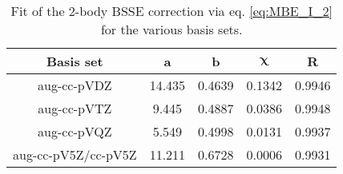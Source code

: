 \begin{table}[t]
\begin{adjustbox}{width=\columnwidth,center}
\begin{tabular}{@{}ccccc@{}}
\toprule
\textbf{Basis set}  & \textbf{a} & \textbf{b} & $\mathbf{\chi}$ & \textbf{R} \\
\hline
aug-cc-pVDZ         & 14.435 & 0.4639 & 0.1342 & 0.9946 \\
aug-cc-pVTZ         & 9.445  & 0.4887 & 0.0386 & 0.9948 \\
aug-cc-pVQZ         & 5.549  & 0.4998 & 0.0131 & 0.9937 \\
aug-cc-pV5Z/cc-pV5Z & 11.211 & 0.6728 & 0.0006 & 0.9931 \\ \bottomrule
\end{tabular}
\end{adjustbox}
\begin{spacing}{1.0}
\caption[Fit of the 2-body BSSE correction via eq. \eqref{eq:MBE_I_2} for the various basis sets.]{Fit of the 2-body BSSE correction via eq. \eqref{eq:MBE_I_2} for the various basis sets.}\label{tab:MBE_I_T6}
\end{spacing}
\end{table}